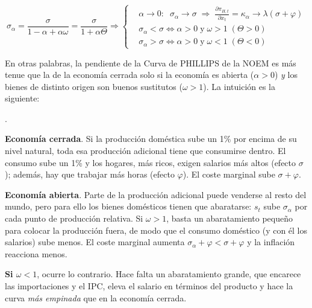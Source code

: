 \documentclass[10pt,a4paper]{article}
\newcounter{numitem}
\newenvironment{lnum}
      {\begin{list}{\arabic{numitem}.}{%
          \usecounter{numitem}%
          \setlength{\leftmargin}{1cm}%
          \setlength{\parskip}{3pt}%
          \setlength{\itemsep}{0pt}%
          \setlength{\parsep}{0pt}%
      }}
      {\end{list}}
\begin{document}
$$\sigma_\alpha=\frac{\sigma}{1-\alpha+\alpha\omega}=\frac{\sigma}{1+\alpha\Theta}\Longrightarrow
\left\{\begin{aligned}
        &\alpha\to0:\;\;\sigma_\alpha\to\sigma\;\Longrightarrow\;\frac{\partial \pi_{H,t}}{\partial x_t}=\kappa_\alpha\to\lambda(\sigma+\varphi)\\[1em]
        &\sigma_\alpha<\sigma\iff\alpha>0\;\text{y}\;\omega>1\;(\Theta>0)\\[0.5em]
        &\sigma_\alpha>\sigma\iff\alpha>0\;\text{y}\;\omega<1\;(\Theta<0)
  \end{aligned}\right.$$

En otras palabras, la pendiente de la Curva de PHILLIPS de la NOEM es más tenue que la de la economía cerrada solo si la economía es abierta ($\alpha>0$) \textit{y} los bienes de distinto origen son buenos sustitutos ($\omega>1$). La intuición es la siguiente:
\begin{lnum}
    \item \textbf{Economía cerrada}. Si la producción doméstica sube un 1\% por encima de su nivel natural, toda esa producción adicional tiene que consumirse dentro. El consumo sube un 1\% y los hogares, más ricos, exigen salarios más altos (efecto $\sigma$); además, hay que trabajar más horas (efecto $\varphi$). El coste marginal sube $\sigma+\varphi$.
    \item \textbf{Economía abierta}. Parte de la producción adicional puede venderse al resto del mundo, pero para ello los bienes domésticos tienen que abaratarse: $s_t$ sube $\sigma_\alpha$ por cada punto de producción relativa. Si $\omega>1$, basta un abaratamiento pequeño para colocar la producción fuera, de modo que el consumo doméstico (y con él los salarios) sube menos. El coste marginal aumenta $\sigma_\alpha+\varphi<\sigma+\varphi$ y la inflación reacciona menos.
    \item \textbf{Si $\omega<1$}, ocurre lo contrario. Hace falta un abaratamiento grande, que encarece las importaciones y el IPC, eleva el salario en términos del producto y hace la curva \textit{más empinada} que en la economía cerrada.
\end{lnum}
\end{document}
